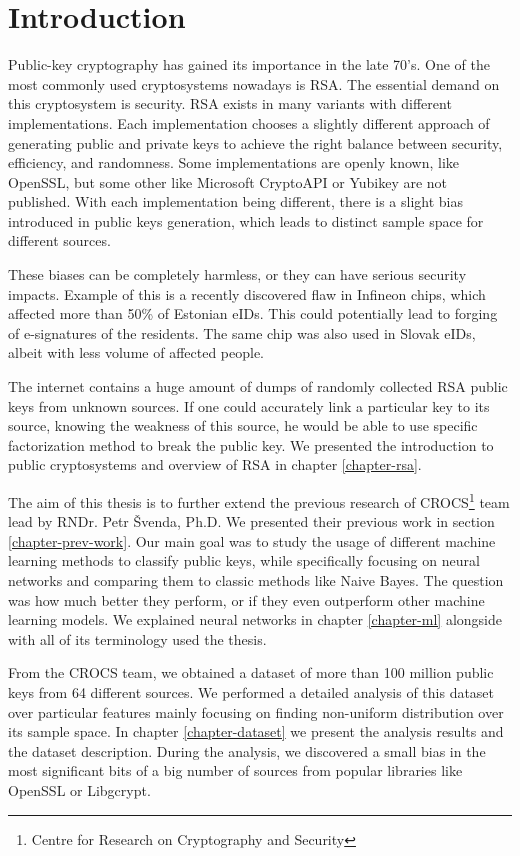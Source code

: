 \chapter{Introduction}

Public-key cryptography has gained its importance in the late 70's. One of the most commonly used cryptosystems nowadays is RSA. The essential demand on this cryptosystem is security. RSA exists in many variants with different implementations. Each implementation chooses a slightly different approach of generating public and private keys to achieve the right balance between security, efficiency, and randomness. Some implementations are openly known, like OpenSSL, but some other like Microsoft CryptoAPI or Yubikey are not published. With each implementation being different, there is a slight bias introduced in public keys generation, which leads to distinct sample space for different sources. 

These biases can be completely harmless, or they can have serious security impacts. Example of this is a recently discovered flaw in Infineon chips\cite{svenda_2}, which affected more than 50\% of Estonian eIDs. This could potentially lead to forging of e-signatures of the residents. The same chip was also used in Slovak eIDs, albeit with less volume of affected people.

The internet contains a huge amount of dumps of randomly collected RSA public keys from unknown sources. If one could accurately link a particular key to its source, knowing the weakness of this source, he would be able to use specific factorization method to break the public key. We presented the introduction to public cryptosystems and overview of RSA in chapter \ref{chapter-rsa}.

The aim of this thesis is to further extend the previous research of CROCS\footnote{Centre for Research on Cryptography and Security} team \cite{svenda_1}\cite{svenda_3} lead by RNDr. Petr Švenda, Ph.D. We presented their previous work in section \ref{chapter-prev-work}. Our main goal was to study the usage of different machine learning methods to classify public keys, while specifically focusing on neural networks and comparing them to classic methods like Naive Bayes. The question was how much better they perform, or if they even outperform other machine learning models. We explained neural networks in chapter \ref{chapter-ml} alongside with all of its terminology used the thesis.

From the CROCS team, we obtained a dataset of more than 100 million public keys from 64 different sources. We performed a detailed analysis of this dataset over particular features mainly focusing on finding non-uniform distribution over its sample space. In chapter \ref{chapter-dataset} we present the analysis results and the dataset description. During the analysis, we discovered a small bias in the most significant bits of a big number of sources from popular libraries like OpenSSL or Libgcrypt.


